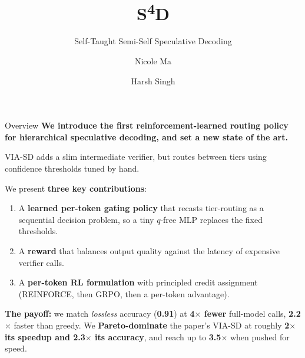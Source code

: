 \documentclass[aspectratio=169,11pt]{beamer}
\title{\textbf{S\textsuperscript{4}D}}
\subtitle{Self-Taught Semi-Self Speculative Decoding}
\author{Nicole Ma \and Harsh Singh}
\date{}
\begin{document}
\begin{frame}\titlepage\end{frame}

\begin{frame}{Overview}
\textbf{We introduce the first reinforcement-learned routing policy for hierarchical speculative decoding, and set a new state of the art.}
\vspace{6pt}

{\footnotesize VIA-SD adds a slim intermediate verifier, but routes between tiers using confidence thresholds tuned by hand.}
\vspace{4pt}

We present \textbf{three key contributions}:
\begin{enumerate}
  \item A \textbf{learned per-token gating policy} that recasts tier-routing as a sequential decision problem, so a tiny $q$-free MLP replaces the fixed thresholds.
  \item A \textbf{reward} that balances output quality against the latency of expensive verifier calls.
  \item A \textbf{per-token RL formulation} with principled credit assignment (REINFORCE, then GRPO, then a per-token advantage).
\end{enumerate}
\vspace{2pt}
{\footnotesize\textbf{The payoff:} we match \emph{lossless} accuracy (\textbf{0.91}) at \textbf{4$\times$ fewer} full-model calls,
\textbf{2.2$\times$} faster than greedy. We \textbf{Pareto-dominate} the paper's VIA-SD at roughly \textbf{2$\times$ its speedup and 2.3$\times$ its accuracy},
and reach up to \textbf{3.5$\times$} when pushed for speed.}
\end{frame}
\end{document}
